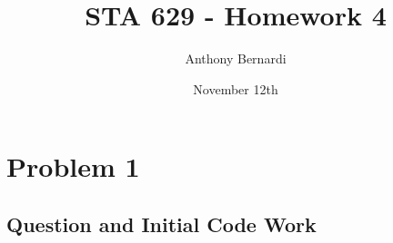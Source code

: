 \documentclass[12pt, letterpaper]{article}
\title{STA 629 - Homework 4}
\author{Anthony Bernardi}
\date{November 12th}, 2024}
\begin{document}
\maketitle

\section{Problem 1}

\subsection{Question and Initial Code Work}
\end{document}

